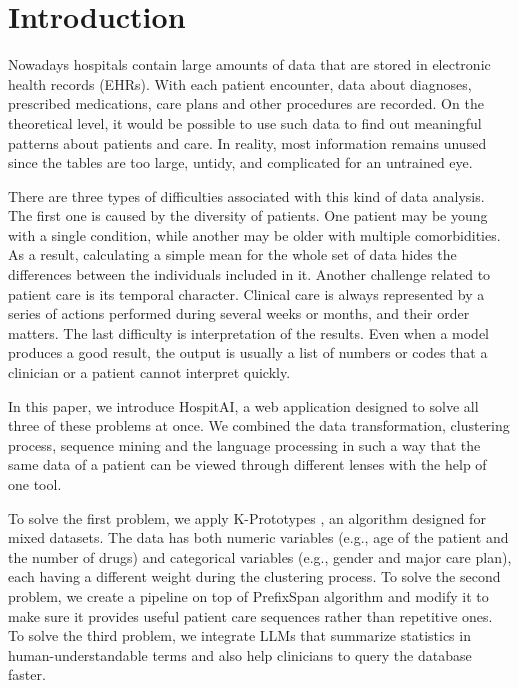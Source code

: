 \section{Introduction}

Nowadays hospitals contain large amounts of data that are stored in electronic health records (EHRs). With each patient encounter, data about diagnoses, prescribed medications, care plans and other procedures are recorded. On the theoretical level, it would be possible to use such data to find out meaningful patterns about patients and care. In reality, most information remains unused since the tables are too large, untidy, and complicated for an untrained eye.

There are three types of difficulties associated with this kind of data analysis. The first one is caused by the diversity of patients. One patient may be young with a single condition, while another may be older with multiple comorbidities. As a result, calculating a simple mean for the whole set of data hides the differences between the individuals included in it. Another challenge related to patient care is its temporal character. Clinical care is always represented by a series of actions performed during several weeks or months, and their order matters. The last difficulty is interpretation of the results. Even when a model produces a good result, the output is usually a list of numbers or codes that a clinician or a patient cannot interpret quickly.

In this paper, we introduce HospitAI, a web application designed to solve all three of these problems at once. We combined the data transformation, clustering process, sequence mining and the language processing in such a way that the same data of a patient can be viewed through different lenses with the help of one tool.

To solve the first problem, we apply K-Prototypes \cite{huang1998}, an algorithm designed for mixed datasets. The data has both numeric variables (e.g., age of the patient and the number of drugs) and categorical variables (e.g., gender and major care plan), each having a different weight during the clustering process. To solve the second problem, we create a pipeline on top of PrefixSpan algorithm \cite{pei2001} and modify it to make sure it provides useful patient care sequences rather than repetitive ones. To solve the third problem, we integrate LLMs that summarize statistics in human-understandable terms and also help clinicians to query the database faster.

